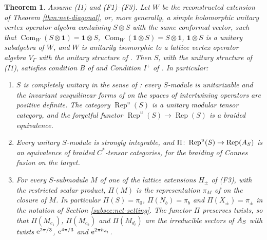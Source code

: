\documentclass[leqno]{article}
\let\cal\relax
\newcommand{\cal}{\mathcal}
\newcommand{\co}{\colon}
\newcommand{\ot}{\otimes}
\let\i\relax
\newcommand{\i}{\mathrm{i}}
\newcommand{\e}{\mathrm{e}}
\DeclareMathOperator{\Rep}{Rep}
\newtheorem{thm}{Theorem}[section]
\numberwithin{equation}{section}
\begin{document}
\begin{thm}
\label{thm:complete-unitarity}
Assume \textup{(I1)} and \textup{(F1)}--\textup{(F3)}. Let $W$ be the reconstructed extension of Theorem \ref{thm:net-diagonal}, or, more generally, a simple holomorphic unitary vertex operator algebra containing $S \ot S$ with the same conformal vector, such that $\operatorname{Com}_W(S \ot \mathbf 1) = \mathbf 1 \ot S$, $\operatorname{Com}_W(\mathbf 1 \ot S) = S \ot \mathbf 1$, $\mathbf 1 \ot S$ is a unitary subalgebra of $W$, and $W$ is unitarily isomorphic to a lattice vertex operator algebra $V_\Gamma$ with the unitary structure of \cite[Theorem 4.12]{DoL14}. Then $S$, with the unitary structure of \textup{(I1)}, satisfies condition B of \cite{Gui26} and Condition I$^+$ of \cite{Gui25}. In particular:
\begin{enumerate}
\item $S$ is completely unitary in the sense of \cite[Definition 1.8 p.~13]{Gui22}: every $S$-module is unitarizable and the invariant sesquilinear forms of \cite{Gui19} on the spaces of intertwining operators are positive definite. The category $\Rep^u(S)$ is a unitary modular tensor category, and the forgetful functor $\Rep^u(S) \to \Rep(S)$ is a braided equivalence.
\item Every unitary $S$-module is strongly integrable, and $\Pi \co \Rep^u(S) \to \Rep(\cal A_S)$ is an equivalence of braided $C^*$-tensor categories, for the braiding of Connes fusion on the target.
\item For every $S$-submodule $M$ of one of the lattice extensions $H_\pm$ of \textup{(F3)}, with the restricted scalar product, $\Pi(M)$ is the representation $\pi_M$ of \cite[Lemma 4.7]{ArhII} on the closure of $M$. In particular $\Pi(S) = \pi_0$, $\Pi(N_b) = \pi_b$ and $\Pi(X_\pm) = \pi_\pm$ in the notation of Section \ref{subsec:net-setting}. The functor $\Pi$ preserves twists, so that $\Pi(M_{c_1})$, $\Pi(M_{c_2})$ and $\Pi(M_{d_l})$ are the irreducible sectors of $\cal A_S$ with twists $\e^{2\pi\i/3}$, $\e^{4\pi\i/3}$ and $\e^{2\pi\i h_{d_l}}$.
\end{enumerate}
\end{thm}
\end{document}
